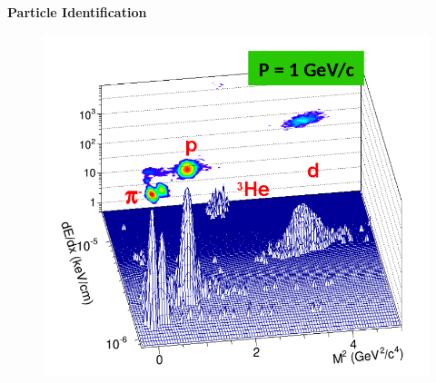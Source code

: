\documentclass[dvipsnames] {beamer}
\begin{document}
\begin{frame}
\begin{columns}[t]
\begin{block}{\bf \centering Particle Identification}
\begin{figure}[H]
        \includegraphics[width=1.\textwidth]{pid_dEdX_ToF.png} 
      \end{figure}     
    \end{block}


\end{columns}
\end{frame}
\end{document}
